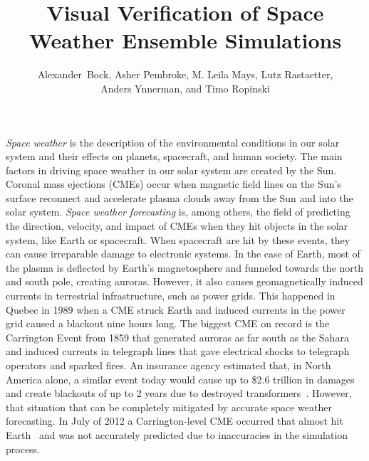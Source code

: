 \documentclass[journal]{vgtc}                %
\title{Visual Verification of Space Weather Ensemble Simulations}
\author{
    Alexander~Bock,
    Asher Pembroke,
    M. Leila Mays,
    Lutz Rastaetter,\\%
    Anders Ynnerman,
    and Timo Ropinski%
}
\begin{document}
\maketitle
\emph{Space weather} is the description of the environmental conditions in our solar system and their effects on planets, spacecraft, and human society. The main factors in driving space weather in our solar system are created by the Sun. Coronal mass ejections (CMEs) occur when magnetic field lines on the Sun's surface reconnect and accelerate plasma clouds away from the Sun and into the solar system. \emph{Space weather forecasting} is, among others, the field of predicting the direction, velocity, and impact of CMEs when they hit objects in the solar system, like Earth or spacecraft. When spacecraft are hit by these events, they can cause irreparable damage to electronic systems. In the case of Earth, most of the plasma is deflected by Earth's magnetosphere and funneled towards the north and south pole, creating auroras. However, it also causes geomagnetically induced currents in terrestrial infrastructure, such as power grids. This happened in Quebec in 1989 when a CME struck Earth and induced currents in the power grid caused a blackout nine hours long. The biggest CME on record is the Carrington Event from 1859 that generated auroras as far south as the Sahara and induced currents in telegraph lines that gave electrical shocks to telegraph operators and sparked fires. An insurance agency estimated that, in North America alone, a similar event today would cause up to \$2.6 trillion in damages and create blackouts of up to 2 years due to destroyed transformers~\cite{lloyds2013impact}. However, that situation that can be completely mitigated by accurate space weather forecasting. In July of 2012 a Carrington-level CME occurred that almost hit Earth~\cite{baker2013major} and was not accurately predicted due to inaccuracies in the simulation process.
\end{document}
